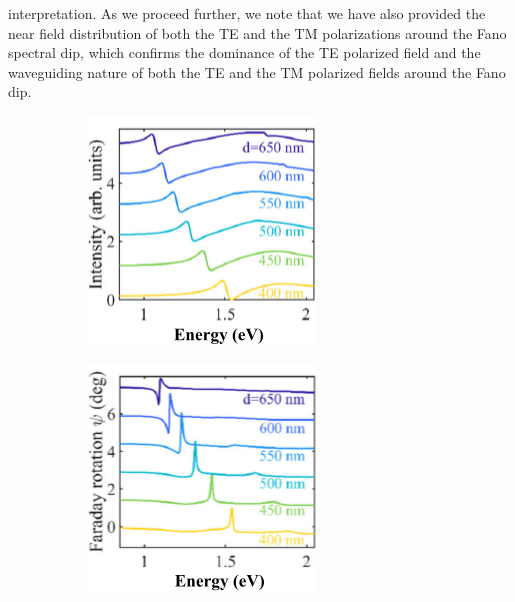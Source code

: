 \documentclass[13pt]{article}
\begin{document}
interpretation. As we proceed further, we note that we have also provided the near field distribution of both the TE and the TM polarizations around the Fano spectral dip, which confirms the dominance of the TE polarized field and the waveguiding nature of both the TE and the TM polarized fields around the Fano dip.
\begin{figure}[hbt]
	\centering
	\begin{subfigure}[]{.49\linewidth}
		\centering
		\includegraphics[width=\linewidth]{Figures/figure2a.png}
		\caption{}
		\label{fig:figure2a}
	\end{subfigure}
	\hfill
	\begin{subfigure}[]{.49\linewidth}
		\centering
		\includegraphics[width=\linewidth]{Figures/figure2b.png}
		\caption{}
		\label{fig:figure2b}
	\end{subfigure}


\end{figure}
\end{document}
